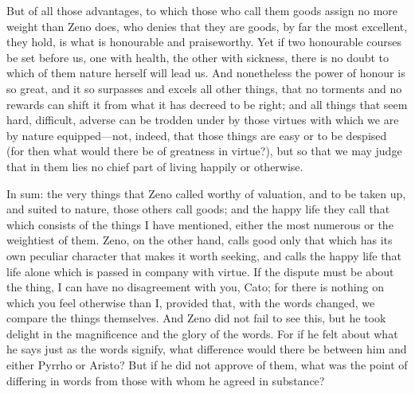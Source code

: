  But of all those advantages, to which those who call them goods assign no more weight than Zeno does, who denies that they are goods, by far the most excellent, they hold, is what is honourable and praiseworthy. Yet if two honourable courses be set before us, one with health, the other with sickness, there is no doubt to which of them nature herself will lead us. And nonetheless the power of honour is so great, and it so surpasses and excels all other things, that no torments and no rewards can shift it from what it has decreed to be right; and all things that seem hard, difficult, adverse can be trodden under by those virtues with which we are by nature equipped—not, indeed, that those things are easy or to be despised (for then what would there be of greatness in virtue?), but so that we may judge that in them lies no chief part of living happily or otherwise.

 In sum: the very things that Zeno called worthy of valuation, and to be taken up, and suited to nature, those others call goods; and the happy life they call that which consists of the things I have mentioned, either the most numerous or the weightiest of them. Zeno, on the other hand, calls good only that which has its own peculiar character that makes it worth seeking, and calls the happy life that life alone which is passed in company with virtue. If the dispute must be about the thing, I can have no disagreement with you, Cato; for there is nothing on which you feel otherwise than I, provided that, with the words changed, we compare the things themselves. And Zeno did not fail to see this, but he took delight in the magnificence and the glory of the words. For if he felt about what he says just as the words signify, what difference would there be between him and either Pyrrho or Aristo? But if he did not approve of them, what was the point of differing in words from those with whom he agreed in substance?

